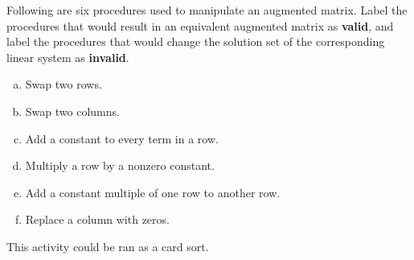 \begin{applicationActivities}{1}{3}
\begin{activity}{10}
  Following are six procedures used to manipulate an augmented matrix.
  Label the procedures that would result in an equivalent augmented
  matrix as \textbf{valid}, and label the procedures that would
  change the solution set of the corresponding linear system as
  \textbf{invalid}.
  \begin{multicols}{2}
    \begin{enumerate}[a)]
      \item Swap two rows.
      \item Swap two columns.
      \item Add a constant to every term in a row.
      \item Multiply a row by a nonzero constant.
      \item Add a constant multiple of one row to another row.
      \item Replace a column with zeros.
    \end{enumerate}
  \end{multicols}
  \begin{TBLnote}
    This activity could be ran as a card sort.
  \end{TBLnote}
\end{activity}

\end{applicationActivities}
